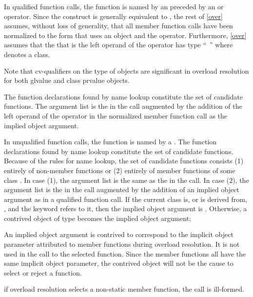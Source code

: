 \pnum
In qualified function calls,
the function is named by an 
preceded by an \tcode{->} or  operator.
Since the
construct
is generally equivalent to
,
the rest of
\ref{over} assumes, without loss of generality, that all member
function calls have been normalized to the form that uses an
object and the
operator.
Furthermore, \ref{over} assumes that
the
that is the left operand of the
operator
has type ``\cv{}~''
where
denotes a class.
\begin{footnote}
Note that cv-qualifiers on the type of objects are
significant in overload
resolution for
both glvalue and class prvalue objects.
\end{footnote}
The function declarations found by name lookup
constitute the set of candidate functions.
The argument list is the
in the call augmented by the addition of the left operand of
the
operator in the normalized member function call as the
implied object argument.

\pnum
In unqualified function calls, the function is named by a
.
The function declarations found by name lookup constitute the
set of candidate functions.
Because of the rules for name lookup, the set of candidate functions
consists (1) entirely of non-member functions or (2) entirely of
member functions of some class
.
In case (1),
the argument list is
the same as the
in the call.
In case (2), the argument list is the
in the call augmented by the addition of an implied object
argument as in a qualified function call.
If the current class is, or is derived from, , and the keyword
 refers to it,
then the implied object argument is .
Otherwise,
a contrived object of type
becomes the implied object argument;
\begin{footnote}
An implied object argument is contrived to
correspond to the implicit object
parameter attributed to member functions during overload resolution.
It is not
used in
the call to the selected function.
Since the member functions all have the
same implicit
object parameter, the contrived object will not be the cause to select or
reject a
function.
\end{footnote}
if overload resolution selects a non-static member function,
the call is ill-formed.

